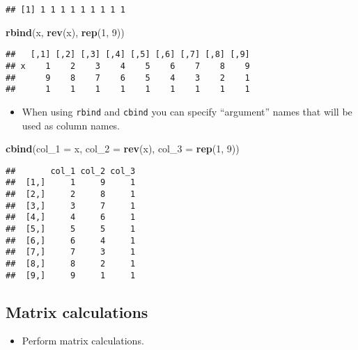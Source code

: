 \documentclass[]{book}
\newenvironment{Shaded}{\begin{snugshade}}{\end{snugshade}}
\newcommand{\KeywordTok}[1]{\textcolor[rgb]{0.13,0.29,0.53}{\textbf{#1}}}
\newcommand{\DataTypeTok}[1]{\textcolor[rgb]{0.13,0.29,0.53}{#1}}
\newcommand{\DecValTok}[1]{\textcolor[rgb]{0.00,0.00,0.81}{#1}}
\newcommand{\NormalTok}[1]{#1}
\providecommand{\tightlist}{%
  \setlength{\itemsep}{0pt}\setlength{\parskip}{0pt}}
\begin{document}
\begin{verbatim}
## [1] 1 1 1 1 1 1 1 1 1
\end{verbatim}

\begin{Shaded}
\begin{Highlighting}[]
\KeywordTok{rbind}\NormalTok{(x, }\KeywordTok{rev}\NormalTok{(x), }\KeywordTok{rep}\NormalTok{(}\DecValTok{1}\NormalTok{, }\DecValTok{9}\NormalTok{))}
\end{Highlighting}
\end{Shaded}

\begin{verbatim}
##   [,1] [,2] [,3] [,4] [,5] [,6] [,7] [,8] [,9]
## x    1    2    3    4    5    6    7    8    9
##      9    8    7    6    5    4    3    2    1
##      1    1    1    1    1    1    1    1    1
\end{verbatim}

\begin{itemize}
\tightlist
\item
  When using \texttt{rbind} and \texttt{cbind} you can specify
  ``argument'' names that will be used as column names.
\end{itemize}

\begin{Shaded}
\begin{Highlighting}[]
\KeywordTok{cbind}\NormalTok{(}\DataTypeTok{col_1 =}\NormalTok{ x, }\DataTypeTok{col_2 =} \KeywordTok{rev}\NormalTok{(x), }\DataTypeTok{col_3 =} \KeywordTok{rep}\NormalTok{(}\DecValTok{1}\NormalTok{, }\DecValTok{9}\NormalTok{))}
\end{Highlighting}
\end{Shaded}

\begin{verbatim}
##       col_1 col_2 col_3
##  [1,]     1     9     1
##  [2,]     2     8     1
##  [3,]     3     7     1
##  [4,]     4     6     1
##  [5,]     5     5     1
##  [6,]     6     4     1
##  [7,]     7     3     1
##  [8,]     8     2     1
##  [9,]     9     1     1
\end{verbatim}

\subsection{Matrix calculations}\label{matrix-calculations}

\begin{itemize}
\tightlist
\item
  Perform matrix calculations.
\end{itemize}
\end{document}
